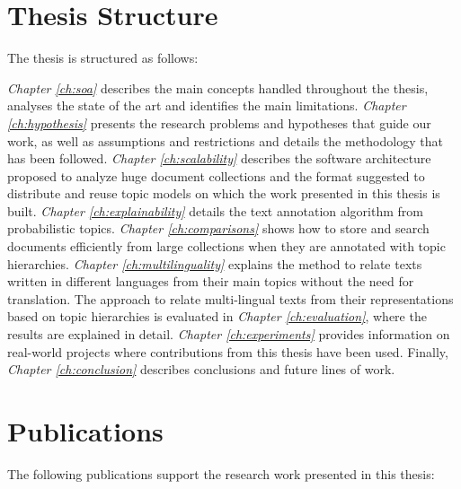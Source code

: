 \section{Thesis Structure}

The thesis is structured as follows:

\textit{Chapter \ref{ch:soa}} describes the main concepts handled throughout the thesis, analyses the state of the art and identifies the main limitations. \textit{Chapter \ref{ch:hypothesis}} presents the research problems and hypotheses that guide our work, as well as assumptions and restrictions and details the methodology that has been followed. \textit{Chapter \ref{ch:scalability}} describes the software architecture proposed to analyze huge document collections and the format suggested to distribute and reuse topic models on which the work presented in this thesis is built. \textit{Chapter \ref{ch:explainability}} details the text annotation algorithm from probabilistic topics. \textit{Chapter \ref{ch:comparisons}} shows how to store and search documents efficiently from large collections when they are annotated with topic hierarchies.  \textit{Chapter \ref{ch:multilinguality}} explains the method to relate texts written in different languages from their main topics without the need for translation. The approach to relate multi-lingual texts from their representations based on topic hierarchies is evaluated in \textit{Chapter \ref{ch:evaluation}}, where the results are explained in detail. \textit{Chapter \ref{ch:experiments}} provides information on real-world projects where contributions from this thesis have been used. Finally, \textit{Chapter \ref{ch:conclusion}} describes conclusions and future lines of work.


\section{Publications}

The following publications support the research work presented in this thesis:


